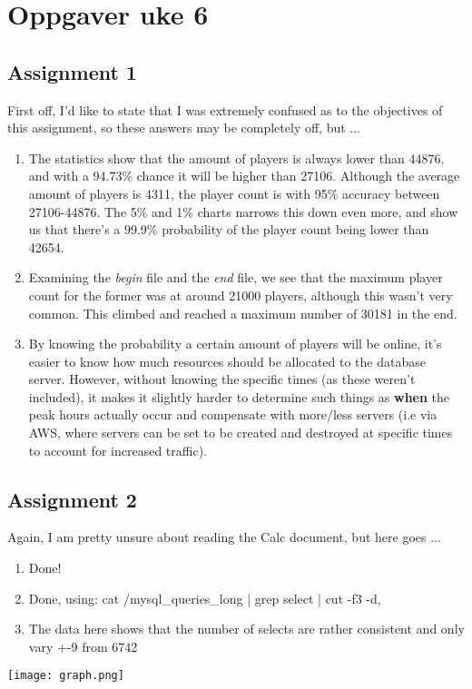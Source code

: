 \section{Oppgaver uke 6}

\subsection{Assignment 1} 

First off, I'd like to state that I was extremely confused as to the objectives of this assignment, so these answers may be completely off, but ...

\begin{enumerate}
	\item The statistics show that the amount of players is always lower than 44876, and with a 94.73\% chance it will be higher than 27106. Although the average amount of players is 4311, the player count is with 95\% accuracy between 27106-44876. The 5\% and 1\% charts narrows this down even more, and show us that there's a 99.9\% probability of the player count being lower than 42654. 
	\item Examining the \textit{begin} file and the \textit{end} file, we see that the maximum player count for the former was at around 21000 players, although this wasn't very common. This climbed and reached a maximum number of 30181 in the end.
	\item By knowing the probability a certain amount of players will be online, it's easier to know how much resources should be allocated to the database server. However, without knowing the specific times (as these weren't included), it makes it slightly harder to determine such things as \textbf{when} the peak hours actually occur and compensate with more/less servers (i.e via AWS, where servers can be set to be created and destroyed at specific times to account for increased traffic).
	
\end{enumerate}

\subsection{Assignment 2}

Again, I am pretty unsure about reading the Calc document, but here goes ...
\begin{enumerate}
	\item Done!
	\item Done, using: cat /mysql\_queries\_long | grep select | cut -f3 -d, 
	\item The data here shows that the number of selects are rather consistent and only vary +-9 from 6742
\end{enumerate}

\texttt{[image: graph.png]}